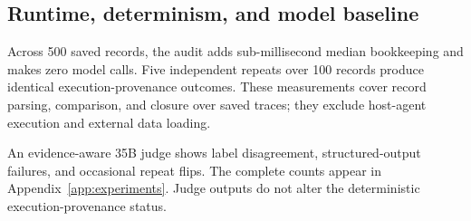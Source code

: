 \subsection{Runtime, determinism, and model baseline}
\label{sec:runtime}

Across 500 saved records, the audit adds sub-millisecond median
bookkeeping and makes zero model calls. Five independent repeats
over 100 records produce identical execution-provenance outcomes.
These measurements cover record parsing, comparison, and closure
over saved traces; they exclude host-agent execution and external
data loading.

An evidence-aware 35B judge shows label disagreement,
structured-output failures, and occasional repeat flips. The
complete counts appear in Appendix~\ref{app:experiments}. Judge outputs
do not alter the deterministic execution-provenance status.

